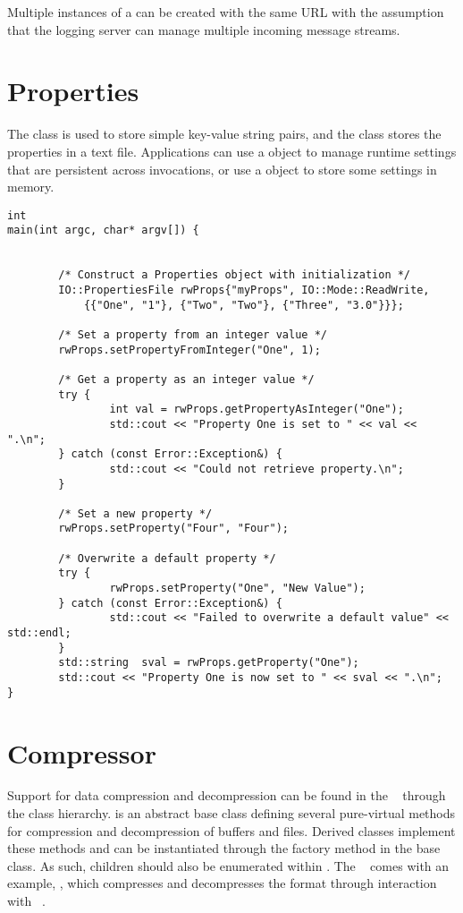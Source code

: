Multiple instances of a  can be created with the same URL
with the assumption that the logging server can manage multiple incoming
message streams.

\section{Properties}
\label{sec-properties}
The  class is used to store simple key-value string pairs, 
and the  class stores the properties in a text file.
Applications can use a  object to manage
runtime settings that are persistent across invocations, or use a 
 object to store some settings in memory.

\begin{lstlisting}[caption={Using a \class{PropertiesFile} Object}, label=lst:propertiesuse]
int
main(int argc, char* argv[]) {


        /* Construct a Properties object with initialization */
        IO::PropertiesFile rwProps{"myProps", IO::Mode::ReadWrite,
            {{"One", "1"}, {"Two", "Two"}, {"Three", "3.0"}}};

        /* Set a property from an integer value */
        rwProps.setPropertyFromInteger("One", 1);

        /* Get a property as an integer value */
        try {
                int val = rwProps.getPropertyAsInteger("One");
                std::cout << "Property One is set to " << val << ".\n";
        } catch (const Error::Exception&) {
                std::cout << "Could not retrieve property.\n";
        }

        /* Set a new property */
        rwProps.setProperty("Four", "Four");

        /* Overwrite a default property */
        try {
                rwProps.setProperty("One", "New Value");
        } catch (const Error::Exception&) {
                std::cout << "Failed to overwrite a default value" << std::endl;
        }
        std::string  sval = rwProps.getProperty("One");
        std::cout << "Property One is now set to " << sval << ".\n";
}
\end{lstlisting}

\section{Compressor}
\label{sec-compressor}

Support for data compression and decompression can be found in the
\lname~ through the  class hierarchy.   is
an abstract base class defining several pure-virtual methods for compression
and decompression of buffers and files.  Derived classes implement these methods
and can be instantiated through the factory method in the base class.
As such, children should also be enumerated within . 
The \lname~ comes with an example, , which compresses and
decompresses the  format through interaction with
~\cite{zlib}.

